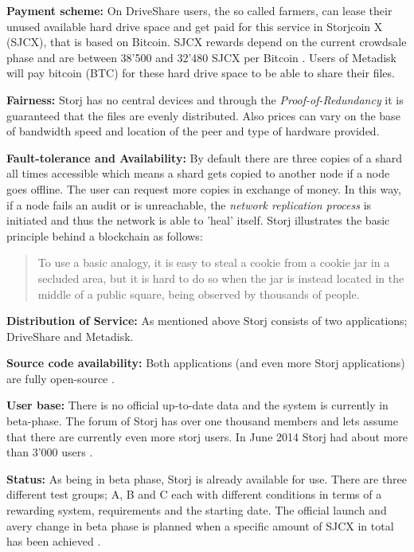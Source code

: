 \textbf{Payment scheme:} On DriveShare users, the so called farmers, can lease their unused available hard drive space and get paid for this service in Storjcoin X (SJCX), that is based on Bitcoin. SJCX rewards depend on the current crowdsale phase and are between 38'500 and 32'480 SJCX per Bitcoin \cite{storj:crowdsale}. Users of Metadisk will pay bitcoin (BTC) for these hard drive space to be able to share their files.

\textbf{Fairness:} Storj has no central devices and through the \textit{Proof-of-Redundancy} it is guaranteed that the files are evenly distributed. Also prices can vary on the base of bandwidth speed and location of the peer and type of hardware provided.

\textbf{Fault-tolerance and Availability:} By default there are three copies of a shard all times accessible which means a shard gets copied to another node if a node goes offline. The user can request more copies in exchange of money. In this way, if a node fails an audit or is unreachable, the \textit{network replication process} is initiated and thus the network is able to 'heal' itself. Storj illustrates the basic principle behind a blockchain as follows:

\begin{quotation}
To use a basic analogy, it is easy to steal a cookie from a cookie jar in a secluded area, but it is hard to do so when the jar is instead located in the middle of a public square, being observed by thousands of people. \cite{storj:PDF}
\end{quotation}

\textbf{Distribution of Service:} As mentioned above Storj consists of two applications; DriveShare and Metadisk.

\textbf{Source code availability:} Both applications (and even more Storj applications) are fully open-source \cite{storj:github}.

\textbf{User base:} There is no official up-to-date data and the system is currently in beta-phase. The forum of Storj has over one thousand members \cite{storj:forum} and lets assume that there are currently even more storj users. In June 2014 Storj had about more than 3'000 users \cite{storj:crowdsale}.

\textbf{Status:} As being in beta phase, Storj is already available for use. There are three different test groups; A, B and C each with different conditions in terms of a rewarding system, requirements and the starting date. The official launch and avery change in beta phase is planned when a specific amount of SJCX in total has been achieved \cite {storj:earlyaccess}.

